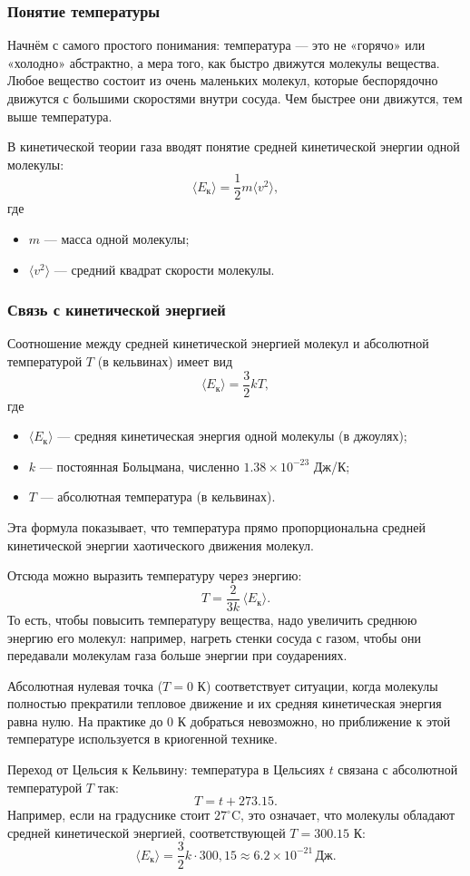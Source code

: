 \documentclass[12pt, a4paper]{article}%
\begin{document}
\subsubsection*{Понятие температуры}

Начнём с самого простого понимания: температура — это не «горячо» или «холодно» абстрактно, а мера того, как быстро движутся молекулы вещества. 
Любое вещество состоит из очень маленьких молекул, которые беспорядочно движутся с большими скоростями внутри сосуда. Чем быстрее они движутся, тем выше температура.

В кинетической теории газа вводят понятие средней кинетической энергии одной молекулы:
\[
\langle E_{\text{к}} \rangle = \frac12 m \langle v^2 \rangle,
\]
где
\begin{itemize}
  \item $m$ — масса одной молекулы;
  \item $\langle v^2 \rangle$ — средний квадрат скорости молекулы.
\end{itemize}

\subsubsection*{Связь с кинетической энергией}
Соотношение между средней кинетической энергией молекул и абсолютной температурой $T$ (в кельвинах) имеет вид
\[
\langle E_{\text{к}}\rangle = \frac32 k T,
\]
где
\begin{itemize}
  \item $\langle E_{\text{к}}\rangle$ — средняя кинетическая энергия одной молекулы (в джоулях);
  \item $k$ — постоянная Больцмана, численно $1{.}38\times10^{-23}$ Дж/К;
  \item $T$ — абсолютная температура (в кельвинах).
\end{itemize}
Эта формула показывает, что температура прямо пропорциональна средней кинетической энергии хаотического движения молекул.

Отсюда можно выразить температуру через энергию:
\[
T = \frac{2}{3k}\,\langle E_{\text{к}}\rangle.
\]
То есть, чтобы повысить температуру вещества, надо увеличить среднюю энергию его молекул: например, нагреть стенки сосуда с газом, чтобы они передавали молекулам газа больше энергии при соударениях.

Абсолютная нулевая точка ($T = 0$ К) соответствует ситуации, когда молекулы полностью прекратили тепловое движение и их средняя кинетическая энергия равна нулю. На практике до $0$ К добраться невозможно, но приближение к этой температуре используется в криогенной технике.

Переход от Цельсия к Кельвину: температура в Цельсиях $t$ связана с абсолютной температурой $T$ так:
\[
T = t + 273{.}15.
\]
Например, если на градуснике стоит $27^\circ$C, это означает, что молекулы обладают средней кинетической энергией, соответствующей $T=300{.}15$ К:
\[
\langle E_{\text{к}}\rangle = \frac32 k\cdot300{,}15 \approx 6.2 \times 10^{-21} \, \text{Дж}.
\]
\end{document}
